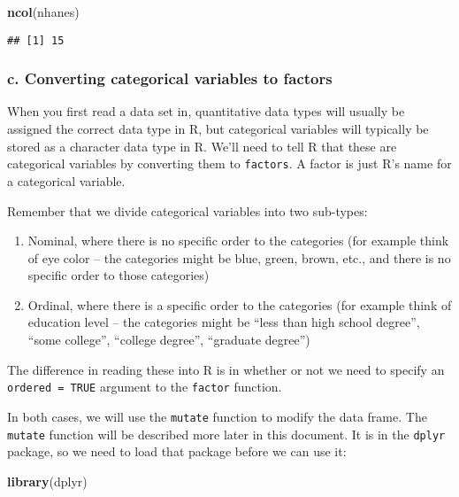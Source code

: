 \documentclass[]{article}
\newenvironment{Shaded}{\begin{snugshade}}{\end{snugshade}}
\newcommand{\KeywordTok}[1]{\textcolor[rgb]{0.13,0.29,0.53}{\textbf{#1}}}
\newcommand{\NormalTok}[1]{#1}
\providecommand{\tightlist}{%
  \setlength{\itemsep}{0pt}\setlength{\parskip}{0pt}}
\begin{document}
\begin{Shaded}
\begin{Highlighting}[]
\KeywordTok{ncol}\NormalTok{(nhanes)}
\end{Highlighting}
\end{Shaded}

\begin{verbatim}
## [1] 15
\end{verbatim}

\subsubsection{c. Converting categorical variables to
factors}\label{c.-converting-categorical-variables-to-factors}

When you first read a data set in, quantitative data types will usually
be assigned the correct data type in R, but categorical variables will
typically be stored as a character data type in R. We'll need to tell R
that these are categorical variables by converting them to
\texttt{factors}. A factor is just R's name for a categorical variable.

Remember that we divide categorical variables into two sub-types:

\begin{enumerate}
\def\labelenumi{\arabic{enumi}.}
\tightlist
\item
  Nominal, where there is no specific order to the categories (for
  example think of eye color -- the categories might be blue, green,
  brown, etc., and there is no specific order to those categories)
\item
  Ordinal, where there is a specific order to the categories (for
  example think of education level -- the categories might be ``less
  than high school degree'', ``some college'', ``college degree'',
  ``graduate degree'')
\end{enumerate}

The difference in reading these into R is in whether or not we need to
specify an \texttt{ordered\ =\ TRUE} argument to the \texttt{factor}
function.

In both cases, we will use the \texttt{mutate} function to modify the
data frame. The \texttt{mutate} function will be described more later in
this document. It is in the \texttt{dplyr} package, so we need to load
that package before we can use it:

\begin{Shaded}
\begin{Highlighting}[]
\KeywordTok{library}\NormalTok{(dplyr)}
\end{Highlighting}
\end{Shaded}
\end{document}
